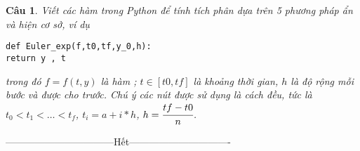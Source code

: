 \documentclass[11pt]{article}
\newtheorem{bt}{Câu}
\begin{document}
\begin{bt} Viết các hàm trong Python để tính tích phân dựa trên 5 phương pháp ẩn và hiện cơ sở, ví dụ 
%
\begin{lstlisting}[frame=single] 
def Euler_exp(f,t0,tf,y_0,h):
return y , t
\end{lstlisting}
%	 
trong đó $f = f(t,y)$ là hàm \quad ; $t \in [t0,tf]$ là khoảng thời gian, $h$ là độ rộng mỗi bước và được cho trước. Chú ý các nút được sử dụng là cách đều, tức là $t_0<t_1<\dots<t_f$, $t_i = a+i*h$, $h=\cfrac{tf-t0}{n}$. 


\end{bt}

\centerline{———————————Hết——————————-}
\end{document}
